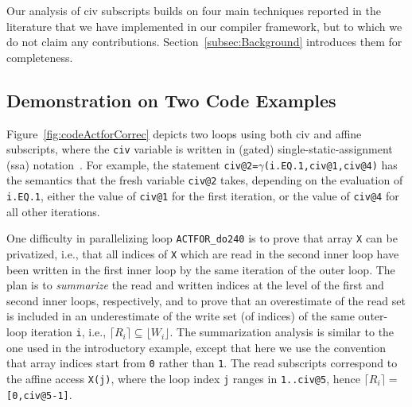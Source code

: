 \documentclass{sig-alternate}
\begin{document}
Our analysis of {\sc civ} subscripts builds on four main techniques 
reported in the literature that we have implemented in our compiler 
framework, but to which we do not claim any contributions.
Section~\ref{subsec:Background} introduces them for completeness.

\subsection{Demonstration on Two Code Examples}
\label{Intro:RelAppLim}

Figure~\ref{fig:codeActforCorrec} depicts two loops
using both {\sc civ} and affine subscripts, where the {\tt civ} variable 
is written in (gated) single-static-assignment ({\sc ssa}) notation~\cite{GatedSSA}.
%
For example, the statement {\tt civ@2=$\gamma$(i.EQ.1,civ@1,civ@4)}
has the semantics that the fresh variable {\tt civ@2} takes, depending 
on the evaluation of {\tt i.EQ.1}, either the value 
of {\tt civ@1} for the first iteration, or the value of 
{\tt civ@4} for all other iterations.

\enlargethispage{\baselineskip}

One difficulty in parallelizing loop {\tt ACTFOR\_do240} is to
prove that array {\tt X} can be privatized, i.e., that all
indices of {\tt X} which are read in the second inner loop have been 
written in the first inner loop by the same iteration of the outer loop.
The plan is to {\em summarize} the read and written indices at the level of
the first and second inner loops, respectively, and to prove that an
overestimate of the read set  is included in an underestimate 
of the write set (of indices) of the same outer-loop iteration {\tt i},
i.e., $\lceil R_i\rceil \subseteq \lfloor W_i\rfloor$.
%
The summarization analysis is similar to the one used in the introductory 
example, except that here we use the convention %
that array indices start from {\tt 0} rather than {\tt 1}.
The read subscripts correspond to the affine access {\tt X(j)}, where
the loop index {\tt j} ranges in {\tt 1..civ@5},
hence $\lceil R_i\rceil = ${\tt[0,civ@5-1]}.
\end{document}
